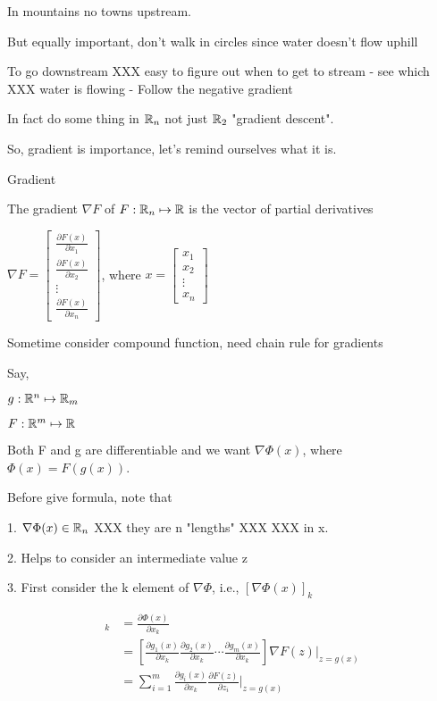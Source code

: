 In mountains no towns upstream.

But equally important, don't walk in circles since water doesn't flow uphill


To go downstream XXX easy to figure out when to get to stream - see which XXX water is flowing - Follow the negative gradient

In fact do some thing in $\mathbb{R}_{n}$ not just $\mathbb{R}_{2}$ "gradient descent".

So, gradient is importance, let's remind ourselves what it is.


Gradient

The gradient $\nabla F$ of $F:\mathbb{R}_{n}\mapsto\mathbb{R}$ is the vector of partial derivatives

$\nabla F= 
\left[ 
\begin{array}{c} 
\frac{\partial F(x)}{\partial x_{1}} \\
\frac{\partial F(x)}{\partial x_{2}} \\
\vdots \\
\frac{\partial F(x)}{\partial x_{n}}
\end{array}
\right]$,
where $x= 
\left[ 
\begin{array}{c} 
x_{1} \\
x_{2} \\
\vdots \\
x_{n}
\end{array}
\right]$

Sometime consider compound function, need chain rule for gradients

Say,

$g:\mathbb{R}^{n}\mapsto\mathbb{R}_{m}$

$F:\mathbb{R}^{m}\mapsto\mathbb{R}$

Both F and g are differentiable and we want $\nabla\Phi (x)$, where $\Phi (x)=F(g(x))$.

Before give formula, note that

1. $\nabla\Phi (x) \in\mathbb{R}_{n}$ XXX they are n "lengths" XXX XXX in x.

2. Helps to consider an intermediate value z

3. First consider the k element of $\nabla\Phi$, i.e., $[\nabla\Phi(x)]_{k}$

\begin{align*}
[\nabla\Phi(x)]_{k}&=\frac{\partial\Phi (x)}{\partial x_{k}}\\
&=[\frac{\partial g_{1}(x)}{\partial x_{k}} \frac{\partial g_{2}(x)}{\partial x_{k}} \cdots \frac{\partial g_{m}(x)}{\partial x_{k}}] \nabla F(z)|_{z=g(x)}\\
&=\sum_{i=1}^{m} \frac{\partial g_{i}(x)}{\partial x_{k}} \frac{\partial F(z)}{\partial z_{i}}|_{z=g(x)}
\end{align*}

